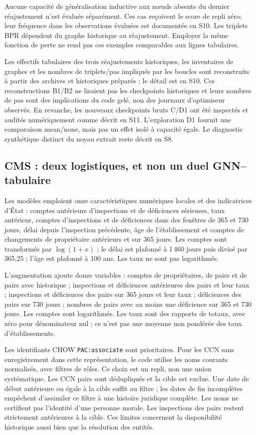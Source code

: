 \documentclass[10pt,a4paper]{article}
\newcommand{\src}[1]{{\small\nolinkurl{#1}}}
\begin{document}
Aucune capacité de généralisation inductive aux nœuds absents du dernier réajustement n'est évaluée séparément. Ces cas reçoivent le score de repli zéro; leur fréquence dans les observations évaluées est documentée en S10. Les triplets BPR dépendent du graphe historique au réajustement. Employer la même fonction de perte ne rend pas ces exemples comparables aux lignes tabulaires.

Les effectifs tabulaires des trois réajustements historiques, les inventaires de graphes et les nombres de triplets/pas impliqués par les boucles sont reconstruits à partir des archives et historiques préparés ; le détail est en S10. Ces reconstructions B1/B2 ne lisaient pas les checkpoints historiques et leurs nombres de pas sont des implications du code gelé, non des journaux d'optimiseur observés. En revanche, les nouveaux checkpoints bruts C/D1 ont été inspectés et audités numériquement comme décrit en S11. L'exploration D1 fournit une comparaison mean/none, mais pas un effet isolé à capacité égale. Le diagnostic synthétique distinct du noyau extrait reste décrit en S8\cite{hgbcode,hgbresults,hamilton2017}.

\subsection{CMS : deux logistiques, et non un duel GNN--tabulaire}
Les modèles emploient onze caractéristiques numériques locales et des indicatrices d'État : comptes antérieurs d'inspections et de déficiences sérieuses, taux antérieur, comptes d'inspections et de déficiences dans des fenêtres de 365 et 730 jours, délai depuis l'inspection précédente, âge de l'établissement et comptes de changements de propriétaire antérieurs et sur 365 jours. Les comptes sont transformés par $\log(1+x)$ ; le délai est plafonné à 1\,460 jours puis divisé par 365,25 ; l'âge est plafonné à 100 ans. Les taux ne sont pas logarithmés.

L'augmentation ajoute douze variables : comptes de propriétaires, de pairs et de pairs avec historique ; inspections et déficiences antérieures des pairs et leur taux ; inspections et déficiences des pairs sur 365 jours et leur taux ; déficiences des pairs sur 730 jours ; nombres de pairs avec au moins une déficience sur 365 et 730 jours. Les comptes sont logarithmés. Les taux sont des rapports de totaux, avec zéro pour dénominateur nul ; ce n'est pas une moyenne non pondérée des taux d'établissements.

Les identifiants CHOW \src{PAC:associate} sont prioritaires. Pour les CCN sans enregistrement dans cette représentation, le code utilise les noms courants normalisés, avec filtres de rôles. Ce choix est un repli, non une union systématique. Les CCN pairs sont dédupliqués et la cible est exclue. Une date de début antérieure ou égale à la cible suffit au filtre ; les dates de fin incomplètes empêchent d'assimiler ce filtre à une histoire juridique complète. Les noms ne certifient pas l'identité d'une personne morale. Les inspections des pairs restent strictement antérieures à la cible. Ces limites concernent la disponibilité historique aussi bien que la résolution des entités\cite{hgbcode}.
\end{document}
